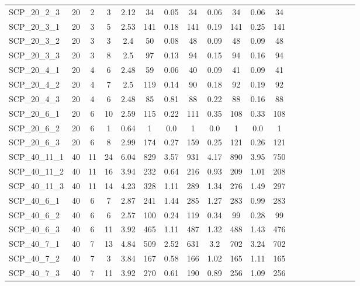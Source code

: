 \begin{sidewaystable}[!ht]
{\begin{tabular}{lccccccccccccccccccc}
SCP\_20\_2\_3 & 20 & 2 & 3 & 2.12 & 34 &  \textcolor{blue2}{0.05} & 34 & 0.06 & 34 & 0.06 & 34 \\
SCP\_20\_3\_1 & 20 & 3 & 5 & 2.53 & 141 &  \textcolor{blue2}{0.18} & 141 & 0.19 & 141 & 0.25 & 141 \\
SCP\_20\_3\_2 & 20 & 3 & 3 & 2.4 & 50 &  \textcolor{blue2}{0.08} & 48 & 0.09 & 48 & 0.09 & 48 \\
SCP\_20\_3\_3 & 20 & 3 & 8 & 2.5 & 97 &  \textcolor{blue2}{0.13} & 94 & 0.15 & 94 & 0.16 & 94 \\
SCP\_20\_4\_1 & 20 & 4 & 6 & 2.48 & 59 &  \textcolor{blue2}{0.06} & 40 & 0.09 & 41 & 0.09 & 41 \\
SCP\_20\_4\_2 & 20 & 4 & 7 & 2.5 & 119 &  \textcolor{blue2}{0.14} & 90 & 0.18 & 92 & 0.19 & 92 \\
SCP\_20\_4\_3 & 20 & 4 & 6 & 2.48 & 85 & 0.81 & 88 & 0.22 & 88 &  \textcolor{blue2}{0.16} & 88 \\
SCP\_20\_6\_1 & 20 & 6 & 10 & 2.59 & 115 &  \textcolor{blue2}{0.22} & 111 & 0.35 & 108 & 0.33 & 108 \\
SCP\_20\_6\_2 & 20 & 6 & 1 & 0.64 & 1 &  \textcolor{blue2}{0.0} & 1 &  \textcolor{blue2}{0.0} & 1 &  \textcolor{blue2}{0.0} & 1 \\
SCP\_20\_6\_3 & 20 & 6 & 8 & 2.99 & 174 & 0.27 & 159 &  \textcolor{blue2}{0.25} & 121 & 0.26 & 121 \\
SCP\_40\_11\_1 & 40 & 11 & 24 & 6.04 & 829 &  \textcolor{blue2}{3.57} & 931 & 4.17 & 890 & 3.95 & 750 \\
SCP\_40\_11\_2 & 40 & 11 & 16 & 3.94 & 232 &  \textcolor{blue2}{0.64} & 216 & 0.93 & 209 & 1.01 & 208 \\
SCP\_40\_11\_3 & 40 & 11 & 14 & 4.23 & 328 &  \textcolor{blue2}{1.11} & 289 & 1.34 & 276 & 1.49 & 297 \\
SCP\_40\_6\_1 & 40 & 6 & 7 & 2.87 & 241 & 1.44 & 285 & 1.27 & 283 &  \textcolor{blue2}{0.99} & 283 \\
SCP\_40\_6\_2 & 40 & 6 & 6 & 2.57 & 100 &  \textcolor{blue2}{0.24} & 119 & 0.34 & 99 & 0.28 & 99 \\
SCP\_40\_6\_3 & 40 & 6 & 11 & 3.92 & 465 &  \textcolor{blue2}{1.11} & 487 & 1.32 & 488 & 1.43 & 476 \\
SCP\_40\_7\_1 & 40 & 7 & 13 & 4.84 & 509 &  \textcolor{blue2}{2.52} & 631 & 3.2 & 702 & 3.24 & 702 \\
SCP\_40\_7\_2 & 40 & 7 & 3 & 3.84 & 167 &  \textcolor{blue2}{0.58} & 166 & 1.02 & 165 & 1.11 & 165 \\
SCP\_40\_7\_3 & 40 & 7 & 11 & 3.92 & 270 &  \textcolor{blue2}{0.61} & 190 & 0.89 & 256 & 1.09 & 256 \\

\end{tabular}}
\end{sidewaystable}
